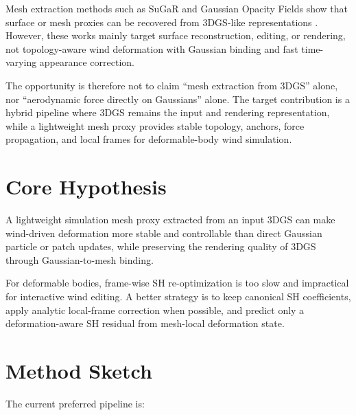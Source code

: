 \documentclass[11pt]{article}
\begin{document}
Mesh extraction methods such as SuGaR and Gaussian Opacity Fields show that surface or mesh proxies can be recovered from 3DGS-like representations \cite{guedon2024sugar,yu2024gof}. However, these works mainly target surface reconstruction, editing, or rendering, not topology-aware wind deformation with Gaussian binding and fast time-varying appearance correction.

The opportunity is therefore not to claim ``mesh extraction from 3DGS'' alone, nor ``aerodynamic force directly on Gaussians'' alone. The target contribution is a hybrid pipeline where 3DGS remains the input and rendering representation, while a lightweight mesh proxy provides stable topology, anchors, force propagation, and local frames for deformable-body wind simulation.

\section{Core Hypothesis}

A lightweight simulation mesh proxy extracted from an input 3DGS can make wind-driven deformation more stable and controllable than direct Gaussian particle or patch updates, while preserving the rendering quality of 3DGS through Gaussian-to-mesh binding.

For deformable bodies, frame-wise SH re-optimization is too slow and impractical for interactive wind editing. A better strategy is to keep canonical SH coefficients, apply analytic local-frame correction when possible, and predict only a deformation-aware SH residual from mesh-local deformation state.

\section{Method Sketch}

The current preferred pipeline is:
\end{document}
